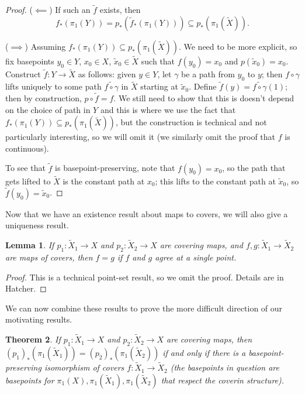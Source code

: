\documentclass{article}
\newtheorem{thm}{Theorem}[section]
\newtheorem{lem}[thm]{Lemma}
\theoremstyle{definition}
\theoremstyle{remark}
\numberwithin{figure}{section}
\begin{document}
\begin{proof}
	($\impliedby$) If such an $\tilde f$ exists, then
	\[
	f_*(\pi_1(Y)) = p_*(\tilde f_*(\pi_1(Y))) \subseteq p_*(\pi_1(\tilde X)).
	\]
	
	($\implies$) Assuming $f_*(\pi_1(Y)) \subseteq p_*(\pi_1(\tilde X))$. We need to be more explicit, so fix basepoints $y_0 \in Y$, $x_0 \in X$, $\tilde x_0 \in \tilde X$ such that $f(y_0) = x_0$ and $p(\tilde x_0) = x_0$. Construct $\tilde f : Y \to \tilde X$ as follows: given $y \in Y$, let $\gamma$ be a path from $y_0$ to $y$; then $f \circ \gamma$ lifts uniquely to some path $\widetilde{f \circ \gamma}$ in $\tilde X$ starting at $\tilde x_0$. Define $\tilde f(y) = \widetilde{f \circ \gamma}(1)$; then by construction, $p \circ \tilde f = f$. We still need to show that this is doesn't depend on the choice of path in $Y$ and this is where we use the fact that $f_*(\pi_1(Y)) \subseteq p_*(\pi_1(\tilde X))$, but the construction is technical and not particularly interesting, so we will omit it (we similarly omit the proof that $f$ is continuous).
	
	To see that $\tilde f$ is basepoint-preserving, note that $f(y_0) = x_0$, so the path that gets lifted to $\tilde X$ is the constant path at $x_0$; this lifts to the constant path at $\tilde x_0$, so $\tilde f(y_0) = \tilde x_0$.
\end{proof}

Now that we have an existence result about maps to covers, we will also give a uniqueness result.

\begin{lem}\label{lem:map of covers unique}
	If $p_1 : \tilde X_1 \to X$ and $p_2 : \tilde X_2 \to X$ are covering maps, and $f, g : \tilde X_1 \to \tilde X_2$ are maps of covers, then $f = g$ if $f$ and $g$ agree at a single point.
\end{lem}

\begin{proof}
	This is a technical point-set result, so we omit the proof. Details are in Hatcher.
\end{proof}

We can now combine these results to prove the more difficult direction of our motivating results.

\begin{thm}
	If $p_1 : \tilde X_1 \to X$ and $p_2 : \tilde X_2 \to X$ are covering maps, then $(p_1)_*(\pi_1(\tilde X_1)) = (p_2)_*(\pi_1(\tilde X_2))$ if and only if there is a basepoint-preserving isomorphism of covers $f : \tilde X_1 \to \tilde X_2$ (the basepoints in question are basepoints for $\pi_1(X), \pi_1(\tilde X_1), \pi_1(\tilde X_2)$ that respect the coverin structure).
\end{thm}
\end{document}
